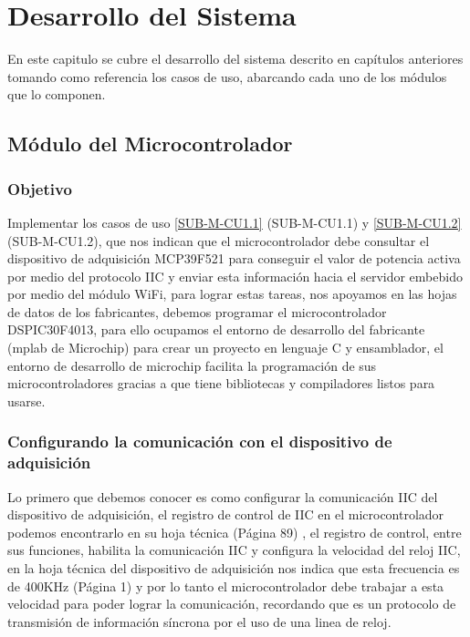 
\chapter{Desarrollo del Sistema}\label{chapter5}

En este capitulo se cubre el desarrollo del sistema descrito en capítulos anteriores tomando como referencia los casos de uso, abarcando cada uno de los módulos que lo componen.

\section{Módulo del Microcontrolador}

\subsection{Objetivo}
Implementar los casos de uso \ref{SUB-M-CU1.1} (SUB-M-CU1.1) y \ref{SUB-M-CU1.2} (SUB-M-CU1.2), que nos indican que el microcontrolador debe consultar el dispositivo de adquisición MCP39F521 para conseguir el valor de potencia activa por medio del protocolo IIC y enviar esta información hacia el servidor embebido por medio del módulo WiFi, para lograr estas tareas, nos apoyamos en las hojas de datos de los fabricantes, debemos programar el microcontrolador DSPIC30F4013, para ello ocupamos el entorno de desarrollo del fabricante (mplab de Microchip) para crear un proyecto en lenguaje C y ensamblador, el entorno de desarrollo de microchip facilita la programación de sus microcontroladores gracias a que tiene bibliotecas y compiladores listos para usarse.

\subsection{Configurando la comunicación con el dispositivo de adquisición}
Lo primero que debemos conocer es como configurar la comunicación IIC del dispositivo de adquisición, el registro de control de IIC en el microcontrolador podemos encontrarlo en su hoja técnica (Página 89) \citep{DatasheetDSPIC30F4013}, el registro de control, entre sus funciones, habilita la comunicación IIC y configura la velocidad del reloj IIC, en la hoja técnica del dispositivo de adquisición nos indica que esta frecuencia es de 400KHz (Página 1) \citep{DatasheetDSPIC30F4013} y por lo tanto el microcontrolador debe trabajar a esta velocidad para poder lograr la comunicación, recordando que es un protocolo de transmisión de información síncrona por el uso de una linea de reloj.

